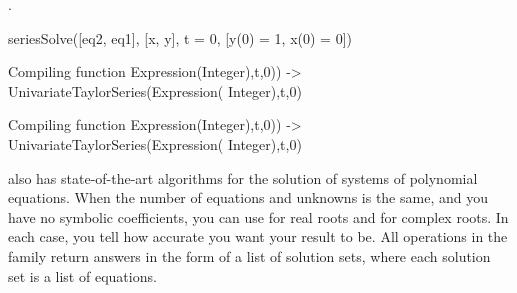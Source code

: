 {{{{{{{{\begin{xtc}
\begin{xtccomment}
.
\end{xtccomment}
\begin{spadsrc}
seriesSolve([eq2, eq1], [x, y], t = 0, [y(0) = 1, x(0) = 0])
\end{spadsrc}
\begin{MessageOutput}
   Compiling function %
      Expression(Integer),t,0)) -> UnivariateTaylorSeries(Expression(
      Integer),t,0) 
\end{MessageOutput}
\begin{MessageOutput}
   Compiling function %
      Expression(Integer),t,0)) -> UnivariateTaylorSeries(Expression(
      Integer),t,0) 
\end{MessageOutput}
\begin{TeXOutput}
\begin{fricasmath}{13}
%
\end{fricasmath}
\end{TeXOutput}
\end{xtc}

%

\Language{} also has state-of-the-art algorithms for the solution
of systems of polynomial equations.
When the number of equations and unknowns is the same, and you
have no symbolic coefficients, you can use  for
real roots and  for complex roots.
In each case, you tell \Language{} how accurate you want your
result to be.
All operations in the  family return answers in
the form of a list of solution sets, where each solution set is a
list of equations.

}}}}}}}}
